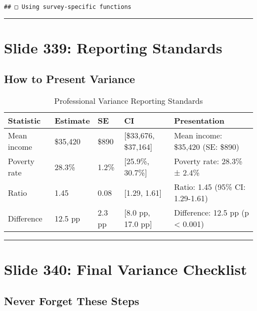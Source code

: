 \documentclass[
]{article}
\begin{document}
\begin{verbatim}
## □ Using survey-specific functions
\end{verbatim}

\begin{center}\rule{0.5\linewidth}{0.5pt}\end{center}

\section{Slide 339: Reporting
Standards}\label{slide-339-reporting-standards}

\subsection{How to Present Variance}\label{how-to-present-variance}

\begin{longtable}[t]{lllll}
\caption{\label{tab:reporting-variance}Professional Variance Reporting Standards}\\
\toprule
Statistic & Estimate & SE & CI & Presentation\\
\midrule
Mean income & \$35,420 & \$890 & {}[\$33,676, \$37,164] & Mean income: \$35,420 (SE: \$890)\\
Poverty rate & 28.3\% & 1.2\% & {}[25.9\%, 30.7\%] & Poverty rate: 28.3\% ± 2.4\%\\
Ratio & 1.45 & 0.08 & {}[1.29, 1.61] & Ratio: 1.45 (95\% CI: 1.29-1.61)\\
Difference & 12.5 pp & 2.3 pp & {}[8.0 pp, 17.0 pp] & Difference: 12.5 pp (p < 0.001)\\
\bottomrule
\end{longtable}

\begin{center}\rule{0.5\linewidth}{0.5pt}\end{center}

\section{Slide 340: Final Variance
Checklist}\label{slide-340-final-variance-checklist}

\subsection{Never Forget These Steps}\label{never-forget-these-steps}
\end{document}
